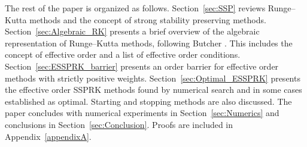The rest of the paper is organized as follows. Section~\ref{sec:SSP} reviews Runge--Kutta methods and the concept of strong stability preserving methods.  Section~\ref{sec:Algebraic_RK} presents a brief overview of the algebraic representation of Runge--Kutta methods, following Butcher \cite{Butcher2008_book}. This includes the concept of effective order and a list of effective order conditions. Section~\ref{sec:ESSPRK_barrier} presents an order barrier for effective order methods with strictly positive weights. Section~\ref{sec:Optimal_ESSPRK} presents the effective order SSPRK methods found by numerical search and in some cases established as optimal. Starting and stopping methods are also discussed.  The paper concludes with numerical experiments in Section~\ref{sec:Numerics} and conclusions in Section~\ref{sec:Conclusion}. Proofs are included in Appendix~\ref{appendixA}.
